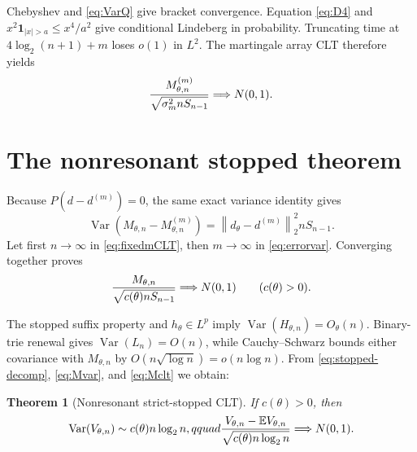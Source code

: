 \documentclass[11pt]{article}
\numberwithin{equation}{section}
\newtheorem{theorem}{Theorem}[section]
\theoremstyle{definition}\newtheorem{definition}[theorem]{Definition}
\theoremstyle{remark}\newtheorem{remark}[theorem]{Remark}
\newcommand{\E}{\mathbb E}\newcommand{\Pp}{\mathbb P}
\newcommand{\Var}{\operatorname {Var}}\newcommand{\Cov}{\operatorname {Cov}}
\newcommand{\1}{\mathbf 1}\newcommand{\cD}{\mathcal D}
\newcommand{\norm}[1]{\left\lVert#1\right\rVert}
\begin{document}
Chebyshev and \eqref{eq:VarQ} give bracket convergence.  Equation
\eqref{eq:D4} and $x^2\1_{|x|>a}\le x^4/a^2$ give conditional Lindeberg in
probability.  Truncating time at $4\log_2(n+1)+m$ loses $o(1)$ in $L^2$.
The martingale array CLT therefore yields
\begin{equation}{M_{\theta,n}^{(m)}\over
 \sqrt{\sigma_m^2nS_{n-1}}}\Longrightarrow N(0,1).             \label{eq:fixedmCLT}
\end{equation}

\clearpage
\section{The nonresonant stopped theorem}\label{sec:nonstop}
Because $P(d-d^{(m)})=0$, the same exact variance identity gives
\begin{equation}
 \Var(M_{\theta,n}-M_{\theta,n}^{(m)})
 =\norm{d_\theta-d^{(m)}}_2^2nS_{n-1}.                         \label{eq:errorvar}
\end{equation}
Let first $n\to\infty$ in \eqref{eq:fixedmCLT}, then $m\to\infty$ in
\eqref{eq:errorvar}.  Converging together proves
\begin{equation}{M_{\theta,n}\over\sqrt{c(\theta)nS_{n-1}}}
 \Longrightarrow N(0,1)\qquad(c(\theta)>0).                   \label{eq:Mclt}
\end{equation}

The stopped suffix property and $h_\theta\in L^p$ imply
$\Var(H_{\theta,n})=O_\theta(n)$.  Binary-trie renewal gives
$\Var(L_n)=O(n)$, while Cauchy--Schwarz bounds either covariance with
$M_{\theta,n}$ by $O(n\sqrt{\log n})=o(n\log n)$.  From
\eqref{eq:stopped-decomp}, \eqref{eq:Mvar}, and \eqref{eq:Mclt} we obtain:
\begin{theorem}[Nonresonant strict-stopped CLT]\label{thm:nonstop}
If $c(\theta)>0$, then
\begin{equation}
 \Var(V_{\theta,n})\sim c(\theta)n\log_2n,qquad
 {V_{\theta,n}-\E V_{\theta,n}\over
 \sqrt{c(\theta)n\log_2n}}\Longrightarrow N(0,1).             \label{eq:Vnon}
\end{equation}
\end{theorem}

\clearpage
\end{document}

